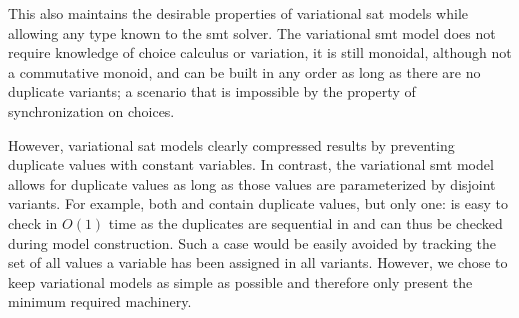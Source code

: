 This also maintains the desirable properties of variational \ac{sat} models
while allowing any type known to the \ac{smt} solver. The variational \ac{smt}
model does not require knowledge of choice calculus or variation, it is still
monoidal, although not a commutative monoid, and can be built in any order as
long as there are no duplicate variants; a scenario that is impossible by the
property of synchronization on choices.

However, variational \ac{sat} models clearly compressed results by preventing
duplicate values with constant variables. In contrast, the variational \ac{smt}
model allows for duplicate values as long as those values are parameterized by
disjoint variants. For example, both \iV{} and \cV{} contain duplicate values,
but only one: \iV{} is easy to check in $O(1)$ time as the duplicates are
sequential in \vc{\iV{}} and can thus be checked during model construction. Such
a case would be easily avoided by tracking the set of all values a variable has
been assigned in all variants. However, we chose to keep variational models as
simple as possible and therefore only present the minimum required machinery.

